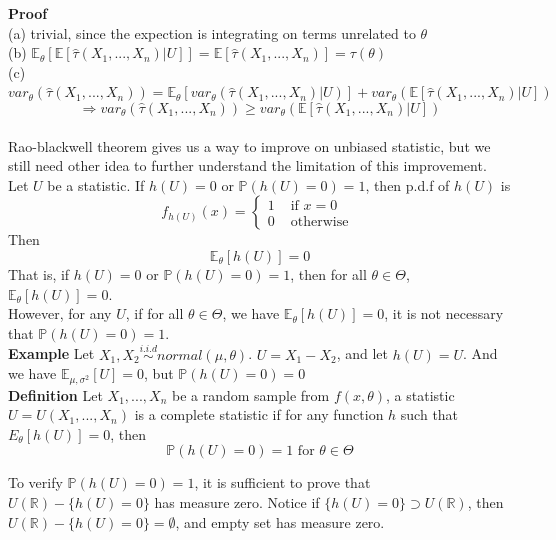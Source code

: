 \documentclass[a4paper,12pt]{article}
\begin{document}
\textbf{Proof}\\
(a) trivial, since the expection is integrating on terms unrelated to $\theta$\\
(b) $\mathbb{E}_\theta[ \mathbb{E}[ \hat{\tau}(X_1, ..., X_n) | U ] ] = \mathbb{E}[ \hat{\tau}(X_1, ..., X_n) ] = \tau(\theta)$\\
(c) $var_\theta( \hat{\tau}(X_1, ..., X_n) ) = \mathbb{E}_\theta[ var_\theta( \hat{\tau}(X_1, ..., X_n) | U) ] + var_\theta( \mathbb{E} [ \hat{\tau}(X_1, ..., X_n) | U ] )$
$$\Rightarrow var_\theta( \hat{\tau}(X_1, ..., X_n) ) \geq var_\theta( \mathbb{E} [ \hat{\tau}(X_1, ..., X_n) | U ] )$$\\

Rao-blackwell theorem gives us a way to improve on unbiased statistic, but we still need other idea to further understand the limitation of this improvement.\\

Let $U$ be a statistic. If $h(U) = 0$ or $\mathbb{P}(h(U)=0)=1$, then p.d.f of $h(U)$ is
$$f_{h(U)}(x) = 
\begin{cases}
1 & \text{ if } x=0\\
0 & \text{ otherwise }
\end{cases}$$
Then
$$\mathbb{E}_\theta[ h(U) ] = 0$$
That is, if $h(U) = 0$ or $\mathbb{P}(h(U)=0)=1$, then for all $\theta\in\Theta$, $\mathbb{E}_\theta[ h(U) ] = 0$.\\

However, for any $U$, if for all $\theta\in\Theta$, we have $\mathbb{E}_\theta[h(U)] = 0$, it is not necessary that $\mathbb{P}(h(U)=0)=1$.\\

\textbf{Example} Let $X_1, X_2 \overset{i.i.d}{\sim} normal(\mu, \theta)$. $U = X_1 - X_2$, and let $h(U) = U$. And we have $\mathbb{E}_{\mu, \sigma^2}[U] = 0$, but $\mathbb{P}(h(U)=0)=0$\\

\textbf{Definition} Let $X_1, ..., X_n$ be a random sample from $f(x, \theta)$, a statistic $U = U(X_1, ..., X_n)$ is a complete statistic if for any function $h$ such that $E_\theta[h(U)] = 0$, then
$$\mathbb{P}(h(U)=0)=1 \text{ for } \theta\in\Theta$$

To verify $\mathbb{P}( h(U) = 0 ) = 1$, it is sufficient to prove that $U(\mathbb{R}) - \{h(U) = 0\}$ has measure zero. Notice if $\{h(U) = 0\} \supset U(\mathbb{R})$, then $U(\mathbb{R}) - \{h(U) = 0\} = \emptyset$, and empty set has measure zero.\\
\end{document}
